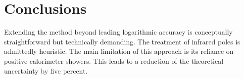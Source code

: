\section{Conclusions}\label{sec:conclusions}

Extending the method beyond leading logarithmic accuracy is conceptually
straightforward but technically demanding. The treatment of infrared
poles is admittedly heuristic. The main limitation of this approach is
its reliance on positive calorimeter showers. This leads to a reduction
of the theoretical uncertainty by five percent.

